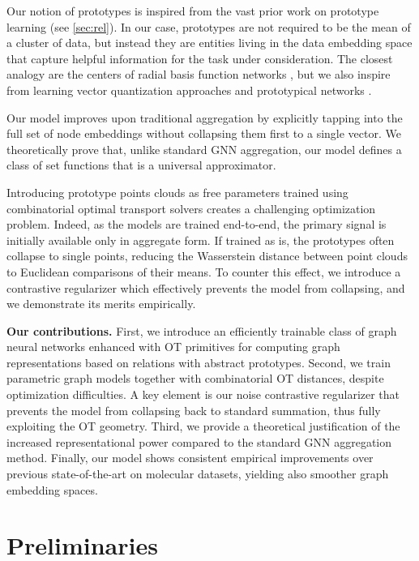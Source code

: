 \documentclass[letterpaper]{article} \usepackage{aaai22}  \usepackage{times}  \usepackage{helvet}  \usepackage{courier}  \usepackage[hyphens]{url}  \usepackage{graphicx} \urlstyle{rm} \def\UrlFont{\rm}  \usepackage{natbib}  \usepackage{caption} \DeclareCaptionStyle{ruled}{labelfont=normalfont,labelsep=colon,strut=off} \frenchspacing  \setlength{\pdfpagewidth}{8.5in}  \setlength{\pdfpageheight}{11in}  \usepackage{algorithm}
\begin{document}
Our notion of prototypes is inspired from the vast prior work on prototype learning (see \cref{sec:rel}). In our case, prototypes are not required to be the mean of a cluster of data, but instead they are entities living in the data embedding space that capture helpful information for the task under consideration. The closest analogy are the centers of radial basis function networks \citep{chen1991orthogonal,poggio1990networks}, but we also inspire from learning vector quantization approaches \citep{kohonen1995learning} and prototypical networks \citep{snell2017prototypical}.

Our model improves upon traditional aggregation by explicitly tapping into the full set of node embeddings without collapsing them first to a single vector. We theoretically prove that, unlike  standard GNN aggregation, our model defines a class of set functions that is a universal approximator.

Introducing prototype points clouds as free parameters trained using combinatorial optimal transport solvers creates a challenging optimization problem. Indeed, as the models are trained end-to-end, the primary signal is initially available only in aggregate form. If trained as is, the prototypes often collapse to single points, reducing the Wasserstein distance between point clouds to Euclidean comparisons of their means. To counter this effect, we introduce a contrastive regularizer which effectively prevents the model from collapsing, and we demonstrate its merits empirically. 

\textbf{Our contributions.} First, we introduce an efficiently trainable class of graph neural networks enhanced with OT primitives for computing graph representations based on relations with abstract prototypes. Second, we train parametric graph models together with combinatorial OT distances, despite optimization difficulties. A key element is our noise contrastive regularizer that prevents the model from collapsing back to standard summation, thus fully exploiting the OT geometry. Third, we provide a theoretical justification of the increased representational power compared to the standard GNN aggregation method. Finally, our model shows consistent empirical improvements over previous state-of-the-art on molecular datasets, yielding also smoother graph embedding spaces.


\section{Preliminaries} \label{sec:prelim}
\end{document}
